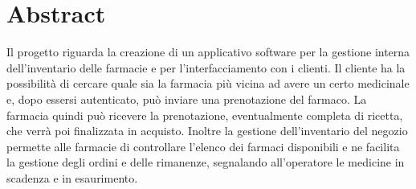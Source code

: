 \newpage
\section{Abstract}
Il progetto riguarda la creazione di un applicativo software per la gestione interna dell’inventario delle farmacie e per l'interfacciamento con i clienti. 
Il cliente ha la possibilità di cercare quale sia la farmacia più vicina ad avere un certo medicinale e, dopo essersi autenticato, può inviare una prenotazione del farmaco.
La farmacia quindi può ricevere la prenotazione, eventualmente completa di ricetta, che verrà poi finalizzata in acquisto. 
Inoltre la gestione dell’inventario del negozio permette alle farmacie di controllare l’elenco dei farmaci disponibili e ne facilita la gestione degli ordini e delle rimanenze, segnalando all'operatore le medicine in scadenza e in esaurimento.
